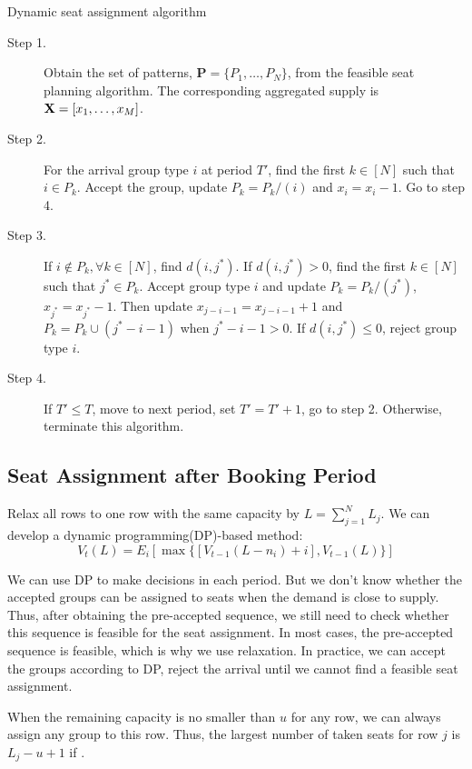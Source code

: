 \begin{algorithm}[H]
  \caption{Dynamic seat assignment algorithm}\label{algo_nested_policy}
  \begin{description}
    \item[Step 1.] Obtain the set of patterns, $\mathbf{P} = \{P_1,\ldots,P_{N}\}$, from the feasible seat planning algorithm. The corresponding aggregated supply is $\mathbf{X} = [x_{1}, \ldots, x_{M}]$.
    \item[Step 2.] For the arrival group type $i$ at period $T{'}$, find the first $k \in [N]$ such that $i \in P_k$. Accept the group, update $P_{k} = P_{k}/(i)$ and $x_{i} = x_{i} -1$. Go to step 4.
    \item[Step 3.] If $i \notin P_k, \forall k \in [N]$, find $d(i,j^{*})$. If $d(i,j^{*})>0$, find the first $k \in [N]$ such that $j^{*} \in P_k$. Accept group type $i$ and update $P_{k} = P_{k}/(j^{*})$, $x_{j^{*}} = x_{j^{*}} -1$. Then update $x_{j-i-1} = x_{j-i-1} + 1$ and $P_{k}= P_{k} \cup (j^{*}-i-1)$ when $j^{*}-i-1 > 0$. If $d(i,j^{*}) \leq 0$, reject group type $i$.
    \item[Step 4.] If $T{'} \leq T$, move to next period, set $T{'} = T{'}+1$, go to step 2. Otherwise, terminate this algorithm.
  \end{description}
\end{algorithm}

\subsection{Seat Assignment after Booking Period}
Relax all rows to one row with the same capacity by $L = \sum_{j=1}^{N} L_j$. We can develop a dynamic programming(DP)-based method:
$$V_{t}(L) = E_{i} [\max\{ {[V_{t-1}(L-n_i)+ i]}, {V_{t-1}(L)}\}]$$


We can use DP to make decisions in each period. But we don't know whether the accepted groups can be assigned to seats when the demand is close to supply. Thus, after obtaining the pre-accepted sequence, we still need to check whether this sequence is feasible for the seat assignment. In most cases, the pre-accepted sequence is feasible, which is why we use relaxation. In practice, we can accept the groups according to DP, reject the arrival until we cannot find a feasible seat assignment.

When the remaining capacity is no smaller than $u$ for any row, we can always assign any group to this row. Thus, the largest number of taken seats for row $j$ is $L_j -u +1$ if . 

